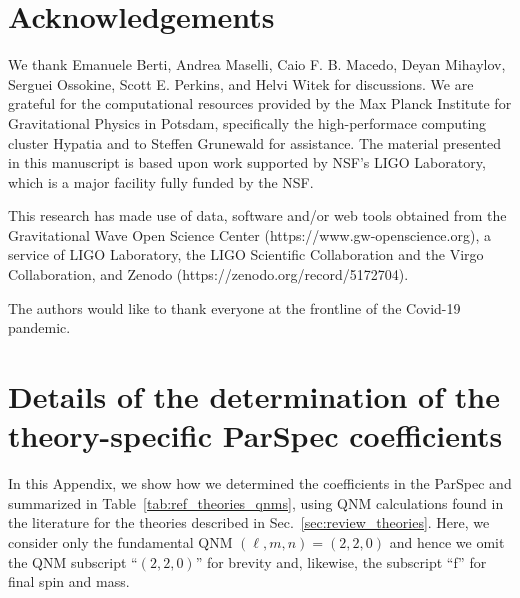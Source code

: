 \documentclass[twocolumn,
               prd,
               aps,
               superscriptaddress,
               tightenlines,
               nofootinbib,
               eqsecnum,
               amsfonts,
               amsmath,
               longbibliography]{revtex4-1}
\begin{document}

\section*{Acknowledgements}
\label{sec:acknowledgements}
%
We thank Emanuele Berti, Andrea Maselli, Caio F. B. Macedo, Deyan Mihaylov,
Serguei Ossokine, Scott E. Perkins, and Helvi Witek for discussions.
%
We are grateful for the computational resources provided by the Max Planck
Institute for Gravitational Physics in Potsdam, specifically the
high-performace computing cluster Hypatia and to Steffen Grunewald for
assistance.
%
The material presented in this manuscript is based upon work supported by NSF’s LIGO Laboratory,
which is a major facility fully funded by the NSF.
%

This research has made use of data, software and/or web tools obtained from the Gravitational Wave Open
Science Center (https://www.gw-openscience.org), a service of LIGO Laboratory, the LIGO Scientific Collaboration
and the Virgo Collaboration, and Zenodo (https://zenodo.org/record/5172704).
%

The authors would like to thank everyone at the frontline of the Covid-19
pandemic.

\appendix

\section{Details of the determination of the theory-specific ParSpec coefficients}
\label{app:map_details}

In this Appendix, we show how we determined the coefficients in the ParSpec
and summarized in Table~\ref{tab:ref_theories_qnms},
using QNM calculations found in the literature for the theories described in
Sec.~\ref{sec:review_theories}.
%
Here, we consider only the fundamental QNM $(\ell, m, n) = (2, 2, 0)$ and
hence we omit the QNM subscript ``$(2,2,0)$'' for brevity and, likewise, the
subscript ``f'' for final spin and mass.
\end{document}
